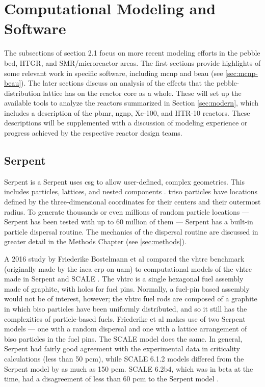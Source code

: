 
\section{Computational Modeling and Software}

The subsections of section 2.1 focus on more recent modeling efforts in the pebble bed, HTGR, and SMR/microreactor areas.  The first sections provide highlights of some relevant work in specific software, including \acrfull{mcnp} \cite{werner_mcnp_2017} and \acrfull{beau} \cite{cisneros_pebble_2013} (see \autoref{sec:mcnp-beau}).  The later sections discuss an analysis of the effects that the pebble-distribution lattice has on the reactor core as a whole.  These will set up the available tools to analyze the reactors summarized in Section \autoref{sec:modern}, which includes a description of the \acrfull{pbmr}, \acrfull{ngnp}, Xe-100, and HTR-10 reactors.  These descriptions will be supplemented with a discussion of modeling experience or progress achieved by the respective reactor design teams.

\subsection{Serpent}

Serpent is a Serpent uses \acrfull{csg} to allow user-defined, complex geometries.  This includes particles, lattices, and nested components \cite{noauthor_serpent_nodate}.  \acrshort{triso} particles have locations defined by the three-dimensional coordinates for their centers and their outermost radius. To generate thousands or even millions of random particle locations --- Serpent has been tested with up to 60 million of them \cite{noauthor_serpent_nodate} --- Serpent has a built-in particle dispersal routine.  The mechanics of the dispersal routine are discussed in greater detail in the Methods Chapter (see \autoref{sec:methods}).

A 2016 study by Friederike Bostelmann et al compared the \acrfull{vhtrc} \cite{oecd_irphe_2019} benchmark (originally made by the \acrfull{iaea} \acrfull{crp} on \acrfull{uam}) to computational models of the \acrshort{vhtrc} made in Serpent and SCALE \cite{bostelmann_criticality_2016}.  The \acrshort{vhtrc} is a single hexagonal fuel assembly made of graphite, with holes for fuel pins.  Normally, a fuel-pin based assembly would not be of interest, however; the \acrshort{vhtrc} fuel rods are composed of a graphite in which \acrshort{biso} particles have been uniformly distributed, and so it still has the complexities of particle-based fuels.  Friederike et al makes use of two Serpent models --- one with a random dispersal and one with a lattice arrangement of \acrshort{biso} particles in the fuel pins.  The SCALE model does the same.  In general, Serpent had fairly good agreement with the experimental data in criticality calculations (less than 50 pcm), while SCALE 6.1.2 models differed from the Serpent model by as much as 150 pcm.  SCALE 6.2b4, which was in beta at the time, had a disagreement of less than 60 pcm to the Serpent model \cite{bostelmann_criticality_2016}.

